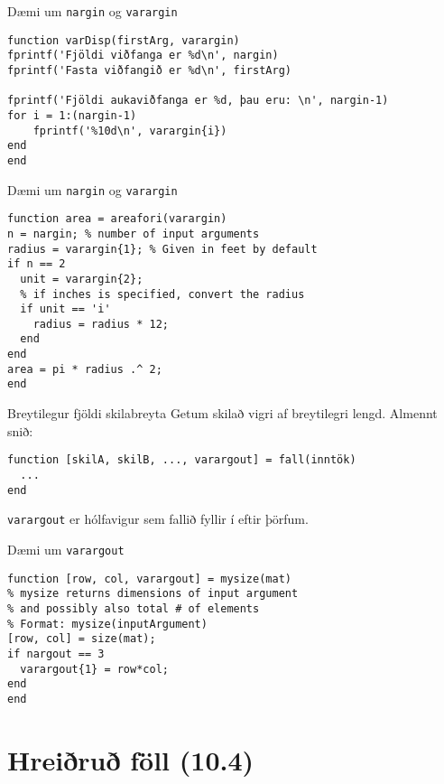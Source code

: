 \documentclass{beamer}
\begin{document}
\begin{frame}[fragile]{Dæmi um \texttt{nargin} og \texttt{varargin}}
\begin{verbatim}
function varDisp(firstArg, varargin)
fprintf('Fjöldi viðfanga er %d\n', nargin)
fprintf('Fasta viðfangið er %d\n', firstArg)

fprintf('Fjöldi aukaviðfanga er %d, þau eru: \n', nargin-1)
for i = 1:(nargin-1)
    fprintf('%10d\n', varargin{i})
end
end
\end{verbatim}
\end{frame}

\begin{frame}[fragile]{Dæmi um \texttt{nargin} og \texttt{varargin}}
\begin{verbatim}
function area = areafori(varargin)
n = nargin; % number of input arguments
radius = varargin{1}; % Given in feet by default
if n == 2
  unit = varargin{2};
  % if inches is specified, convert the radius
  if unit == 'i'
    radius = radius * 12;
  end
end
area = pi * radius .^ 2;
end
\end{verbatim}

\end{frame}

\begin{frame}[fragile]{Breytilegur fjöldi skilabreyta}
Getum skilað vigri af breytilegri lengd. Almennt snið:
\begin{verbatim}
function [skilA, skilB, ..., varargout] = fall(inntök)
  ...
end
\end{verbatim}
\texttt{varargout} er hólfavigur sem fallið fyllir í eftir þörfum.
\end{frame}

\begin{frame}[fragile]{Dæmi um \texttt{varargout}}
\begin{verbatim}
function [row, col, varargout] = mysize(mat)
% mysize returns dimensions of input argument
% and possibly also total # of elements
% Format: mysize(inputArgument)
[row, col] = size(mat);
if nargout == 3
  varargout{1} = row*col;
end
end
\end{verbatim}

\end{frame}

\section{Hreiðruð föll (10.4)}
\end{document}
